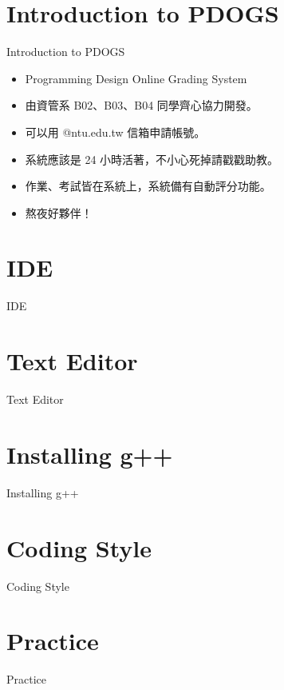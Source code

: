 \documentclass[t]{beamer}
\begin{document}
\section{Introduction to PDOGS}
\begin{frame}{Introduction to PDOGS}
\begin{itemize}
\item Programming Design Online Grading System
\item 由資管系 B02、B03、B04 同學齊心協力開發。
\item 可以用 @ntu.edu.tw 信箱申請帳號。
\item 系統應該是 24 小時活著，不小心死掉請戳戳助教。
\item 作業、考試皆在系統上，系統備有自動評分功能。
\item 熬夜好夥伴！
\end{itemize}
\end{frame}

\section{IDE}
\begin{frame}{IDE}
\end{frame}

\section{Text Editor}
\begin{frame}{Text Editor}
\end{frame}

\section{Installing g++}
\begin{frame}{Installing g++}
\end{frame}

\section{Coding Style}
\begin{frame}{Coding Style}
\end{frame}

\section{Practice}
\begin{frame}{Practice}
\end{frame}
\end{document}
